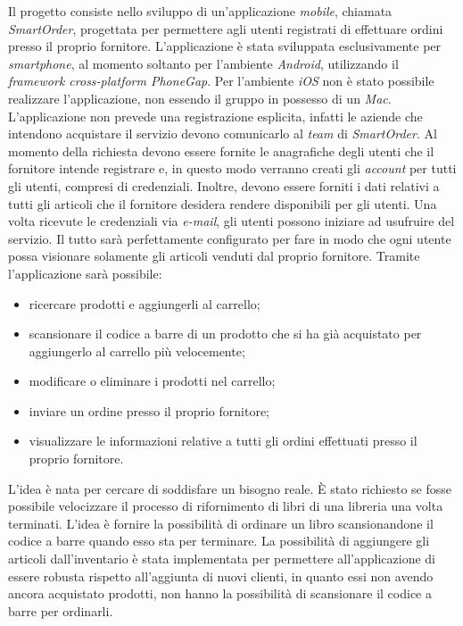 \documentclass[12pt, a4paper, titlepage]{report}
\begin{document}
	Il progetto consiste nello sviluppo di un'applicazione \textit{mobile}, chiamata \textit{SmartOrder}, progettata per permettere agli utenti registrati di effettuare ordini presso il proprio fornitore. L'applicazione è stata sviluppata esclusivamente per \textit{smartphone}, al momento soltanto per l'ambiente \textit{Android}, utilizzando il \textit{framework cross-platform PhoneGap}. Per l'ambiente \textit{iOS} non è stato possibile realizzare l'applicazione, non essendo il gruppo in possesso di un \textit{Mac}. L'applicazione non prevede una registrazione esplicita, infatti le aziende che intendono acquistare il servizio devono comunicarlo al \textit{team} di \textit{SmartOrder}. Al momento della richiesta devono essere fornite le anagrafiche degli utenti che il fornitore intende registrare e, in questo modo verranno creati gli \textit{account} per tutti gli utenti, compresi di credenziali. Inoltre, devono essere forniti i dati relativi a tutti gli articoli che il fornitore desidera rendere disponibili per gli utenti. Una volta ricevute le credenziali via \textit{e-mail}, gli utenti possono iniziare ad usufruire del servizio. Il tutto sarà perfettamente configurato per fare in modo che ogni utente possa visionare solamente gli articoli venduti dal proprio fornitore. Tramite l'applicazione sarà possibile:
	\begin{itemize}
		\item ricercare prodotti e aggiungerli al carrello;
		\item scansionare il codice a barre di un prodotto che si ha già acquistato per aggiungerlo al carrello più velocemente;
		\item modificare o eliminare i prodotti nel carrello;
		\item inviare un ordine presso il proprio fornitore;
		\item visualizzare le informazioni relative a tutti gli ordini effettuati presso il proprio fornitore.
	\end{itemize}
	L'idea è nata per cercare di soddisfare un bisogno reale. È stato richiesto se fosse possibile velocizzare il processo di rifornimento di libri di una libreria una volta terminati. L'idea è fornire la possibilità di ordinare un libro scansionandone il codice a barre quando esso sta per terminare. La possibilità di aggiungere gli articoli dall'inventario è stata implementata per permettere all'applicazione di essere robusta rispetto all'aggiunta di nuovi clienti, in quanto essi non avendo ancora acquistato prodotti, non hanno la possibilità di scansionare il codice a barre per ordinarli.
	\medskip
	
\end{document}
